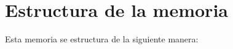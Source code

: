 \documentclass[a4paper, 12pt]{book}
\begin{document}






\section{Estructura de la memoria}
\label{sec:estructura}






Esta memoria se estructura de la siguiente manera:
\end{document}
